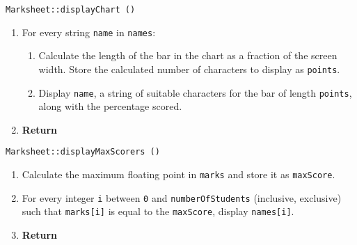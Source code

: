 \vspace{5mm}
{\tt Marksheet::displayChart ()}
\begin{enumerate}
	\item	For every string {\tt name} in {\tt names}:
	\begin{enumerate}
		\item	Calculate the length of the bar in the chart as a fraction of the screen width.
				Store the calculated number of characters to display as {\tt points}.
		\item	Display {\tt name}, a string of suitable characters for the bar of length {\tt points},
				along with the percentage scored.
	\end{enumerate}
	\item	{\bf Return}
\end{enumerate}
\vspace{5mm}
{\tt Marksheet::displayMaxScorers ()}
\begin{enumerate}
	\item	Calculate the maximum floating point in {\tt marks} and store it as {\tt maxScore}.
	\item	For every integer {\tt i} between {\tt 0} and {\tt numberOfStudents} (inclusive, exclusive)
			such that {\tt marks[i]} is equal to the {\tt maxScore}, display {\tt names[i]}.
	\item	{\bf Return}
\end{enumerate}

\sourcecode



